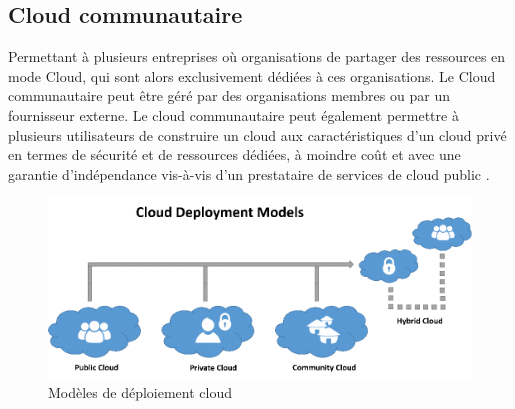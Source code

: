\subsection{Cloud communautaire}
Permettant à plusieurs entreprises où organisations de partager des ressources en mode Cloud, qui sont alors exclusivement dédiées à ces organisations. Le Cloud communautaire peut être géré par des organisations membres ou par un fournisseur externe. Le cloud communautaire peut également permettre à plusieurs utilisateurs de construire un cloud aux caractéristiques d'un cloud privé en termes de sécurité et de ressources dédiées, à moindre coût et avec une garantie d'indépendance vis-à-vis d'un prestataire de services de cloud public \cite{c1}.

\begin{figure}[H]
\centering
\includegraphics[scale=0.6]{chap1/fc6.png}
\caption{Modèles de déploiement cloud}
\label{fc6}
\end{figure}


